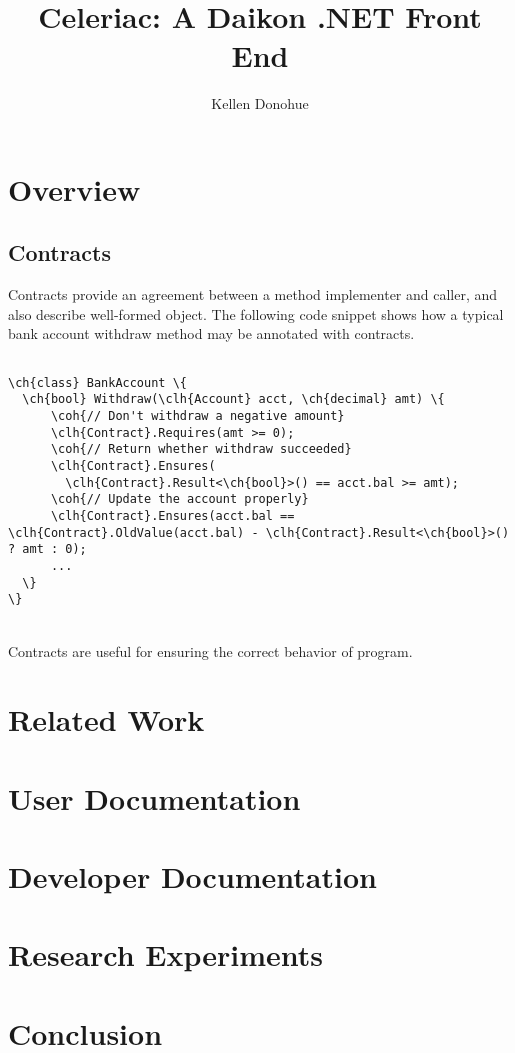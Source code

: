 \documentclass{article}
\title{Celeriac: A Daikon .NET Front End}
\author{Kellen Donohue}
\newcommand\ch[1]{\textcolor[rgb]{0,0,1}{\textbf{#1}}}
\newcommand\clh[1]{\textcolor[rgb]{0,.5,1}{\textbf{#1}}}
\newcommand\coh[1]{\textcolor[rgb]{0,.6,0}{\textbf{#1}}}
\begin{document}
\maketitle

\section{Overview}
\subsection{Contracts}
Contracts provide an agreement between a method implementer and caller, and also describe well-formed object. The following code snippet shows how a typical bank account withdraw method may be annotated with contracts.
\begin{center}
\begin{Verbatim}[commandchars=\\\{\}]

\ch{class} BankAccount \{
  \ch{bool} Withdraw(\clh{Account} acct, \ch{decimal} amt) \{
      \coh{// Don't withdraw a negative amount}
      \clh{Contract}.Requires(amt >= 0);
      \coh{// Return whether withdraw succeeded}
      \clh{Contract}.Ensures(
        \clh{Contract}.Result<\ch{bool}>() == acct.bal >= amt);
      \coh{// Update the account properly}
      \clh{Contract}.Ensures(acct.bal == \clh{Contract}.OldValue(acct.bal) - \clh{Contract}.Result<\ch{bool}>() ? amt : 0);
      ...
  \}
\}
\end{Verbatim}
\end{center} 
\~ \\
Contracts are useful for ensuring the correct behavior of program.
\section{Related Work}
\section{User Documentation}
\section{Developer Documentation}
\section{Research Experiments}
\section{Conclusion}

\newpage


\end{document}
